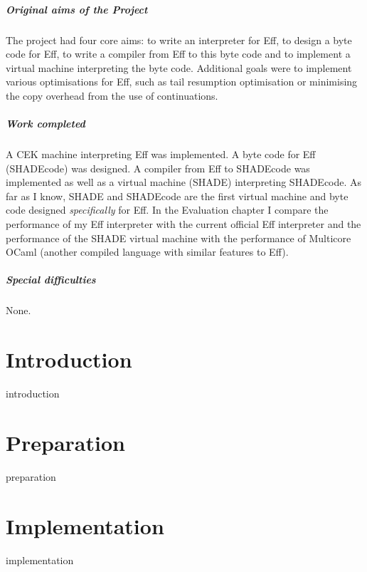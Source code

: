 \documentclass[%
    12pt,
    bibliography=toc,
    listof=leveldown,%
    oneside
]{book}
\begin{document}
\paragraph{Original aims of the Project}

The project had four core aims: to write an interpreter for Eff, to design a
byte code for Eff, to write a compiler from Eff to this byte code and to
implement a virtual machine interpreting the byte code. Additional goals were
to implement various optimisations for Eff, such as tail resumption optimisation
or minimising the copy overhead from the use of continuations.

\paragraph{Work completed}

A CEK machine interpreting Eff was implemented. A byte code for Eff (SHADEcode)
was designed. A compiler from Eff to SHADEcode was implemented as well as a
virtual machine (SHADE) interpreting SHADEcode. As far as I know, SHADE and
SHADEcode are the first virtual machine and byte code designed
\emph{specifically} for Eff. In the Evaluation chapter I compare the performance
of my Eff interpreter with the current official Eff interpreter and the
performance of the SHADE virtual machine with the performance of Multicore
OCaml (another compiled language with similar features to Eff).

\paragraph{Special difficulties}
None.

\tableofcontents

\newpage
\listoffigures
\listoftables
\lstlistoflistings

\mainmatter

\chapter{Introduction}
{introduction}

\chapter{Preparation}
{preparation}

\chapter{Implementation}
{implementation}
\end{document}
